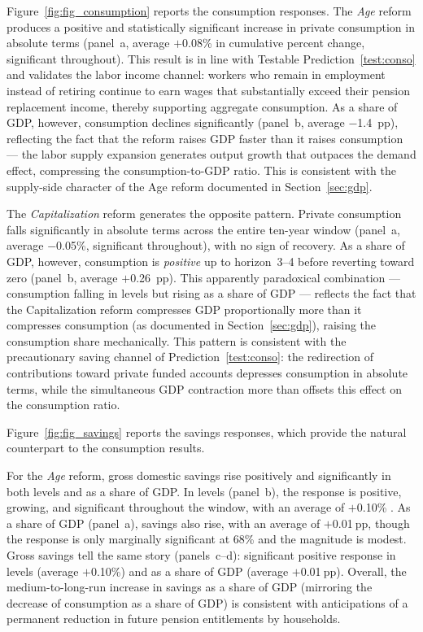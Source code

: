 \documentclass[11pt,english,a4paper, twoside, authoryear]{article}
\begin{document}
Figure~\ref{fig:fig_consumption} reports the consumption responses. The \textit{Age} reform produces a positive and statistically significant increase in private consumption in absolute terms (panel~a, average $+$0.08\% in cumulative percent change, significant throughout). This result is in line with Testable Prediction~\ref{test:conso} and validates the labor income channel: workers who remain in employment instead of retiring continue to earn wages that substantially exceed their pension replacement income, thereby supporting aggregate consumption. As a share of GDP, however, consumption declines significantly (panel~b, average $-$1.4~pp), reflecting the fact that the reform raises GDP faster than it raises consumption --- the labor supply expansion generates output growth that outpaces the demand effect, compressing the consumption-to-GDP ratio. This is consistent with the supply-side character of the Age reform documented in Section~\ref{sec:gdp}.

The \textit{Capitalization} reform generates the opposite pattern. Private consumption falls significantly in absolute terms across the entire ten-year window (panel~a, average $-$0.05\%, significant throughout), with no sign of recovery. As a share of GDP, however, consumption is \emph{positive} up to horizon~3--4 before reverting toward zero (panel~b, average $+$0.26~pp). This apparently paradoxical combination --- consumption falling in levels but rising as a share of GDP --- reflects the fact that the Capitalization reform compresses GDP proportionally more than it compresses consumption (as documented in Section~\ref{sec:gdp}), raising the consumption share mechanically. This pattern is consistent with the precautionary saving channel of Prediction~\ref{test:conso}: the redirection of contributions toward private funded accounts depresses consumption in absolute terms, while the simultaneous GDP contraction more than offsets this effect on the consumption ratio.

Figure~\ref{fig:fig_savings} reports the savings responses, which provide the natural counterpart to the consumption results.

For the \textit{Age} reform, gross domestic savings rise positively and significantly in both levels and as a share of GDP. In levels (panel~b), the response is positive, growing, and significant throughout the window, with an average of $+$0.10\% . As a share of GDP (panel~a), savings also rise, with an average of $+$0.01$~$pp, though the response is only marginally significant at 68\% and the magnitude is modest. Gross savings tell the same story (panels~c--d): significant positive response in levels (average $+$0.10\%) and as a share of GDP (average $+$0.01$~$pp). Overall, the medium-to-long-run increase in savings as a share of GDP (mirroring the decrease of consumption as a share of GDP) is consistent with anticipations of a permanent reduction in future pension entitlements by households.
\end{document}
